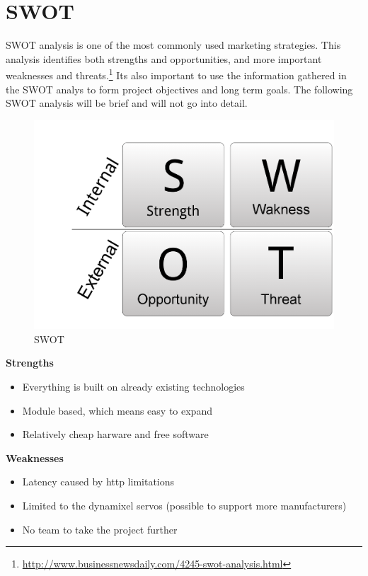 \chapter{SWOT}
SWOT analysis is one of the most commonly used marketing strategies. 
This analysis identifies both strengths and opportunities, and more important weaknesses and threats.\footnote{\url{http://www.businessnewsdaily.com/4245-swot-analysis.html}}
Its also important to use the information gathered in the SWOT analys to form project objectives and long term goals. 
The following SWOT analysis will be brief and will not go into detail. 
\vspace{\secspace}

\begin{figure}[H]
    \centering
    \includegraphics[width=0.6/textwidth]{graphics/swot.png}	
    \caption{SWOT}
    \label{fig:sw}
\end{figure}

\textbf{\Large Strengths}
\begin{itemize}
	 \item Everything is built on already existing technologies
	 \item Module based, which means easy to expand
	 \item Relatively cheap harware and free software
\end{itemize}

\textbf{\Large Weaknesses}
\begin{itemize}
	 \item Latency caused by http limitations
	 \item Limited to the dynamixel servos (possible to support more manufacturers)
	 \item No team to take the project further
\end{itemize}

